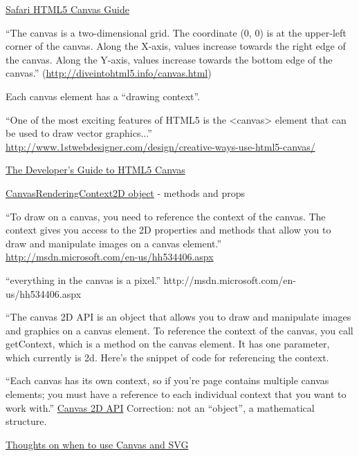 \documentclass[12pt]{tufte-handout}
\numberwithin{equation}{subsection}
\numberwithin{equation}{subsection}
\begin{document}
\begin{appendices}
                \href{https://developer.apple.com/library/safari/documentation/AudioVideo/Conceptual/HTML-canvas-guide/Introduction/Introduction.html#//apple_ref/doc/uid/TP40010542-CH1-SW1}{Safari HTML5 Canvas Guide}

                ``The canvas is a two-dimensional grid. The coordinate (0, 0) is at the upper-left corner of the canvas. Along the X-axis, values increase towards the right edge of the canvas. Along the Y-axis, values increase towards the bottom edge of the canvas.'' (\url{http://diveintohtml5.info/canvas.html})

                Each canvas element has a ``drawing context''.

                ``One of the most exciting features of HTML5 is the <canvas> element that can be used to draw vector graphics...'' \url{http://www.1stwebdesigner.com/design/creative-ways-use-html5-canvas/}


                \href{http://msdn.microsoft.com/en-us/hh534406.aspx}{The Developer’s Guide to HTML5 Canvas}

                \href{http://msdn.microsoft.com/en-us/library/ff975057.aspx}{CanvasRenderingContext2D object} - methods and props

                ``To draw on a canvas, you need to reference the context of the canvas.  The context gives you access to the 2D properties and methods that allow you to draw and manipulate images on a canvas element.'' \url{http://msdn.microsoft.com/en-us/hh534406.aspx}

                ``everything in the canvas is a pixel.'' http://msdn.microsoft.com/en-us/hh534406.aspx

                ``The canvas 2D API is an object that allows you to draw and
                manipulate images and graphics on a canvas element.  To reference the context of the canvas, you call getContext, which is a method on the canvas element.  It has one parameter, which currently is 2d.  Here’s the snippet of code for referencing the context.

                ``Each canvas has its own context, so if you’re page contains multiple canvas elements; you must have a reference to each individual context that you want to work with.'' \url{Canvas 2D
                  API}  Correction: not an ``object'', a mathematical structure.

                \href{http://blogs.msdn.com/b/ie/archive/2011/04/22/thoughts-on-when-to-use-canvas-and-svg.aspx}{Thoughts on when to use Canvas and SVG}


\end{appendices}
\end{document}
